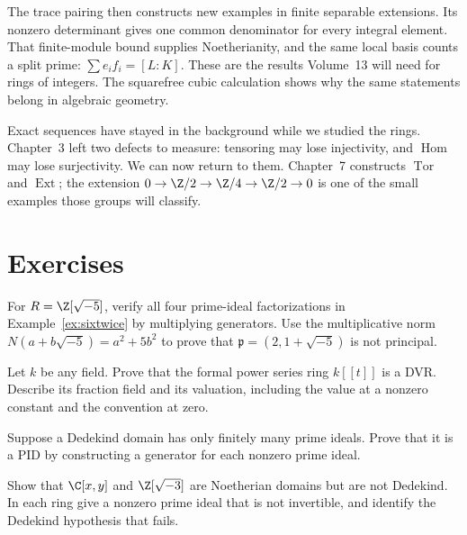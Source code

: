 The trace pairing then constructs new examples in finite separable extensions. Its nonzero determinant gives one common denominator for every integral element. That finite-module bound supplies Noetherianity, and the same local basis counts a split prime: $\sum e_if_i=[L:K]$. These are the results Volume~13 will need for rings of integers. The squarefree cubic calculation shows why the same statements belong in algebraic geometry.

Exact sequences have stayed in the background while we studied the rings. Chapter~3 left two defects to measure: tensoring may lose injectivity, and $\operatorname{Hom}$ may lose surjectivity. We can now return to them. Chapter~7 constructs $\operatorname{Tor}$ and $\operatorname{Ext}$; the extension $0\to\Z/2\to\Z/4\to\Z/2\to0$ is one of the small examples those groups will classify.

\section{Exercises}

\begin{exercise}[$\star$]\label{ex:zsqrt5}
For $R=\Z[\sqrt{-5}]$, verify all four prime-ideal factorizations in Example~\ref{ex:sixtwice} by multiplying generators. Use the multiplicative norm $N(a+b\sqrt{-5})=a^2+5b^2$ to prove that $\mathfrak p=(2,1+\sqrt{-5})$ is not principal.
\end{exercise}

\begin{exercise}[$\star$]\label{ex:powerseries}
Let $k$ be any field. Prove that the formal power series ring $k[[t]]$ is a DVR. Describe its fraction field and its valuation, including the value at a nonzero constant and the convention at zero.
\end{exercise}

\begin{exercise}[$\star\star$]\label{ex:semilocal}
Suppose a Dedekind domain has only finitely many prime ideals. Prove that it is a PID by constructing a generator for each nonzero prime ideal.
\end{exercise}

\begin{exercise}[$\star\star$]\label{ex:notdedekind}
Show that $\C[x,y]$ and $\Z[\sqrt{-3}]$ are Noetherian domains but are not Dedekind. In each ring give a nonzero prime ideal that is not invertible, and identify the Dedekind hypothesis that fails.
\end{exercise}

